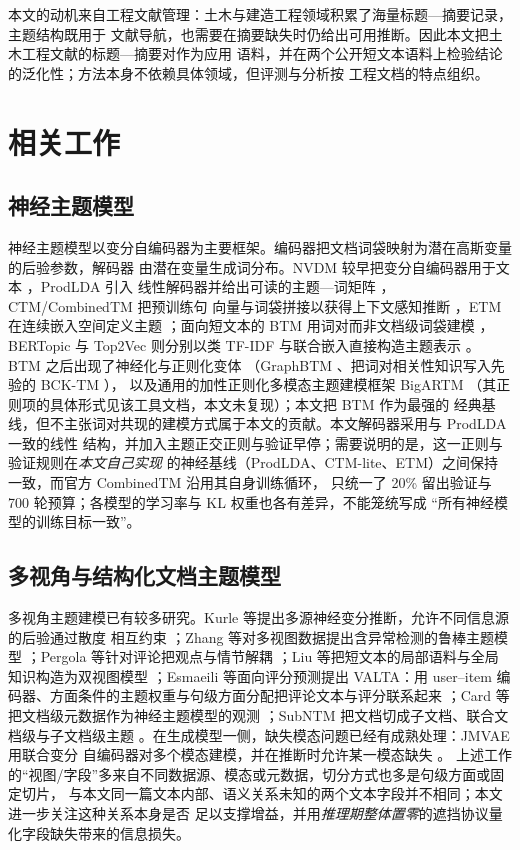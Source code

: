 \documentclass[11pt]{ctexart}
\begin{document}
本文的动机来自工程文献管理：土木与建造工程领域积累了海量标题—摘要记录，主题结构既用于
文献导航，也需要在摘要缺失时仍给出可用推断。因此本文把土木工程文献的标题—摘要对作为应用
语料，并在两个公开短文本语料上检验结论的泛化性；方法本身不依赖具体领域，但评测与分析按
工程文档的特点组织。

\section{相关工作}

\subsection{神经主题模型}

神经主题模型以变分自编码器为主要框架。编码器把文档词袋映射为潜在高斯变量的后验参数，解码器
由潜在变量生成词分布。NVDM 较早把变分自编码器用于文本 \cite{miao2016nvdm}，ProdLDA 引入
线性解码器并给出可读的主题—词矩阵 \cite{srivastava2017avitm}，CTM/CombinedTM 把预训练句
向量与词袋拼接以获得上下文感知推断 \cite{bianchi2021ctm}，ETM 在连续嵌入空间定义主题
\cite{dieng2020etm}；面向短文本的 BTM 用词对而非文档级词袋建模 \cite{yan2013btm}，
BERTopic 与 Top2Vec 则分别以类 TF-IDF 与联合嵌入直接构造主题表示
\cite{grootendorst2022bertopic,angelov2020top2vec}。BTM 之后出现了神经化与正则化变体
（GraphBTM \cite{zhu2018graphbtm}、把词对相关性知识写入先验的 BCK-TM \cite{zhang2020bcktm}），
以及通用的加性正则化多模态主题建模框架 BigARTM \cite{vorontsov2015bigartm}
（其正则项的具体形式见该工具文档，本文未复现）；本文把 BTM 作为最强的
经典基线，但不主张词对共现的建模方式属于本文的贡献。本文解码器采用与 ProdLDA 一致的线性
结构，并加入主题正交正则与验证早停；需要说明的是，这一正则与验证规则在\emph{本文自己实现}
的神经基线（ProdLDA、CTM-lite、ETM）之间保持一致，而官方 CombinedTM 沿用其自身训练循环，
只统一了 20\% 留出验证与 700 轮预算；各模型的学习率与 KL 权重也各有差异，不能笼统写成
“所有神经模型的训练目标一致”。

\subsection{多视角与结构化文档主题模型}

多视角主题建模已有较多研究。Kurle 等提出多源神经变分推断，允许不同信息源的后验通过散度
相互约束 \cite{kurle2019multisource}；Zhang 等对多视图数据提出含异常检测的鲁棒主题模型
\cite{zhang2017robust}；Pergola 等针对评论把观点与情节解耦
\cite{pergola2021disentangled}；Liu 等把短文本的局部语料与全局知识构造为双视图模型
\cite{liu2022dualview}；Esmaeili 等面向评分预测提出 VALTA：用 user--item 编码器、方面条件的主题权重与句级方面分配把评论文本与评分联系起来
\cite{esmaeili2019structured}；Card 等把文档级元数据作为神经主题模型的观测
\cite{card2018metadata}；SubNTM 把文档切成子文档、联合文档级与子文档级主题
\cite{nguyen2026subntm}。在生成模型一侧，缺失模态问题已经有成熟处理：JMVAE 用联合变分
自编码器对多个模态建模，并在推断时允许某一模态缺失 \cite{suzuki2017jmvae}。
上述工作的“视图/字段”多来自不同数据源、模态或元数据，切分方式也多是句级方面或固定切片，
与本文同一篇文本内部、语义关系未知的两个文本字段并不相同；本文进一步关注这种关系本身是否
足以支撑增益，并用\emph{推理期整体置零}的遮挡协议量化字段缺失带来的信息损失。
\end{document}
